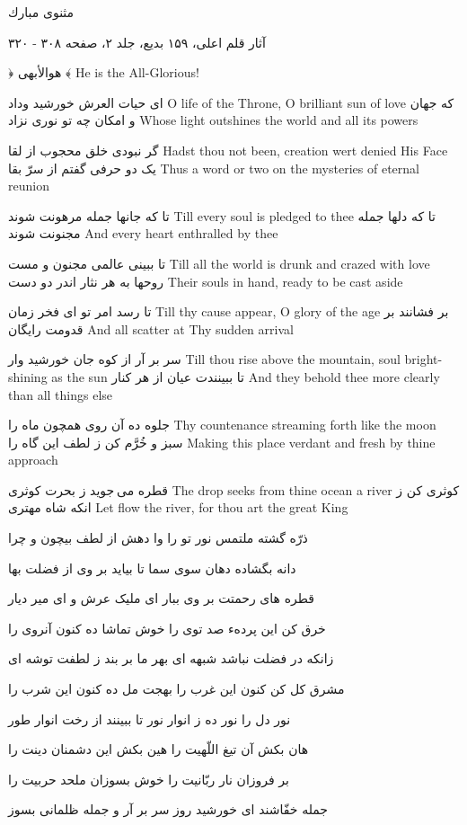 مثنوى مبارك

آثار قلم اعلى، ۱۵۹ بديع، جلد ۲، صفحه ۳۰۸ - ۳۲۰

﴿ هوالأبهى ﴾
He is the All-Glorious!

اى حيات العرش خورشيد وداد
O life of the Throne, O brilliant sun of love
که جهان و امکان چه تو نورى نزاد
Whose light outshines the world and all its powers

گر نبودى خلق محجوب از لقا
Hadst thou not been, creation wert denied His Face
يک دو حرفى گفتم از سرّ بقا
Thus a word or two on the mysteries of eternal reunion

تا که جانها جمله مرهونت شوند
Till every soul is pledged to thee
تا که دلها جمله مجنونت شوند
And every heart enthralled by thee

تا ببينى عالمى مجنون و مست
Till all the world is drunk and crazed with love
روحها به هر نثار اندر دو دست
Their souls in hand, ready to be cast aside

تا رسد امر تو اى فخر زمان
Till thy cause appear, O glory of the age
بر فشانند بر قدومت رايگان
And all scatter at Thy sudden arrival

سر بر آر از کوه جان خورشيد وار
Till thou rise above the mountain, soul bright-shining as the sun
تا ببينندت عيان از هر کنار
And they behold thee more clearly than all things else

جلوه ده آن روى همچون ماه را
Thy countenance streaming forth like the moon
سبز و خُرَّم کن ز لطف اين گاه را
Making this place verdant and fresh by thine approach

قطره مى جويد ز بحرت کوثرى
The drop seeks from thine ocean a river
کوثرى کن ز انکه شاه مهترى
Let flow the river, for thou art the great King

ذرّه گشته ملتمس نور تو را
وا دهش از لطف بيچون و چرا

دانه بگشاده دهان سوى سما
تا بيايد بر وى از فضلت بها

قطره هاى رحمتت بر وى ببار
اى مليک عرش و اى مير ديار

خرق کن اين پردهء صد توى را
خوش تماشا ده کنون آنروى را

زانکه در فضلت نباشد شبهه اى
بهر ما بر بند ز لطفت توشه اى

مشرق کل کن کنون اين غرب را
بهجت مل ده کنون اين شرب را

نور دل را نور ده ز انوار نور
تا ببينند از رخت انوار طور

هان بکش آن تيغ اللّهيت را
هين بکش اين دشمنان دينت را

بر فروزان نار ربّانيت را
خوش بسوزان ملحد حربيت را

جمله خفّاشند اى خورشيد روز
سر بر آر و جمله ظلمانى بسوز

